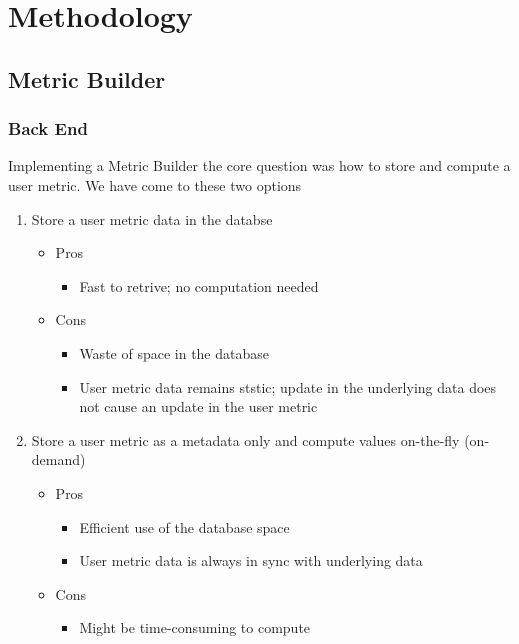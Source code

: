 \chapter{Methodology}

\section{Metric Builder}

	\subsection{Back End}

		Implementing a Metric Builder the core question was how to store and compute a user metric. We have come to these two options

		\begin{enumerate}
			\item
				Store a user metric data in the databse
				\begin{itemize}
					\item
						Pros
						\begin{itemize}
							\item
								Fast to retrive; no computation needed
						\end{itemize}
					\item
						Cons
						\begin{itemize}
							\item
								Waste of space in the database
							\item
								User metric data remains ststic; update in the underlying data does not cause an update in the user metric
						\end{itemize}
				\end{itemize}
			\item
				Store a user metric as a metadata only and compute values on-the-fly (on-demand)
				\begin{itemize}
					\item
						Pros
						\begin{itemize}
							\item
								Efficient use of the database space
							\item
								User metric data is always in sync with underlying data
						\end{itemize}
					\item
						Cons
						\begin{itemize}
							\item
								Might be time-consuming to compute
						\end{itemize}
				\end{itemize}
		\end{enumerate}

